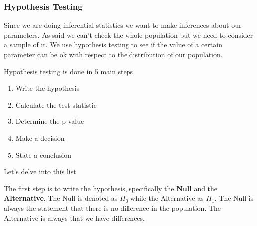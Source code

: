 \vspace{10pt}

\subsubsection{Hypothesis Testing}

\vspace{10pt}

Since we are doing inferential statistics we want to make inferences about our parameters.
As said we can't check the whole population but we need to consider a sample of it.
We use hypothesis testing to see if the value of a certain parameter can be ok with respect to the distribution of our population.

\vspace{10pt}

Hypothesis testing is done in 5 main steps

\begin{enumerate}
    \item Write the hypothesis
    \item Calculate the test statistic
    \item Determine the p-value
    \item Make a decision
    \item State a conclusion
\end{enumerate}

\vspace{10pt}

Let's delve into this list

\vspace{10pt}

The first step is to write the hypothesis, specifically the \textbf{Null} and the \textbf{Alternative}. The Null is denoted as $H_0$ while the Alternative as $H_1$.
The Null is always the statement that there is no difference in the population. The Alternative is always that we have differences.

